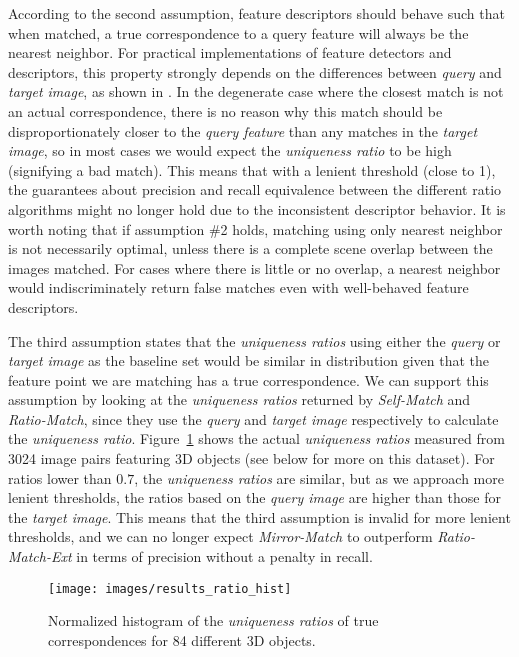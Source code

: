 \documentclass[10pt,journal,cspaper,compsoc]{IEEEtran}
\begin{document}
According to the second assumption, feature descriptors should behave such that
when matched, a true correspondence to a query feature will always be 
the nearest neighbor. For practical implementations of feature detectors and descriptors, 
this property strongly depends on the differences between \emph{query} 
and \emph{target image}, as shown in  
\cite{mikolajczyk2005performance,tuytelaars2008local}. In the degenerate 
case where the closest match is not an actual correspondence, there is 
no reason why this match should be disproportionately closer to the 
\emph{query feature} than any matches in the \emph{target image}, so in 
most cases we would expect the \emph{uniqueness ratio} to be high 
(signifying a bad match). This means that with a lenient threshold (close 
to 1), the guarantees about precision and recall equivalence between the 
different ratio algorithms might no longer hold due to the inconsistent descriptor behavior. 
It is worth noting that if 
assumption \#2 holds, matching using only nearest neighbor is not 
necessarily optimal, unless there is a complete scene overlap between
the images matched. For cases where there is little or no overlap, a 
nearest neighbor would indiscriminately return false matches even with 
well-behaved feature descriptors.

The third assumption states that the \emph{uniqueness ratios} using either the 
\emph{query} or \emph{target image} as the baseline set would be similar
in distribution given that the feature point we are matching has a true 
correspondence. We can support this assumption by looking at the 
\emph{uniqueness ratios} returned by \emph{Self-Match} and 
\emph{Ratio-Match}, since they use the \emph{query} and 
\emph{target image} respectively to calculate the \emph{uniqueness ratio}.  
Figure~\ref{fig:ratio_hist} shows the actual \emph{uniqueness ratios} 
measured from 3024 image pairs featuring 3D objects (see below for more on this dataset).  
For ratios lower than $0.7$, the \emph{uniqueness ratios} are similar, but as we approach 
more lenient thresholds, the ratios based on the \emph{query image} are 
higher than those for the \emph{target image}. This means that the third assumption 
is invalid for more lenient thresholds, and we can no longer expect \emph{Mirror-Match} to outperform 
\emph{Ratio-Match-Ext} in terms of precision without a penalty in recall.


\begin{figure}[htb]
\centering
\texttt{[image: images/results\_ratio\_hist]}
\caption{Normalized histogram of the \emph{uniqueness ratios} of true 
correspondences for 84 different 3D objects.}
\label{fig:ratio_hist}
\end{figure}
\end{document}
